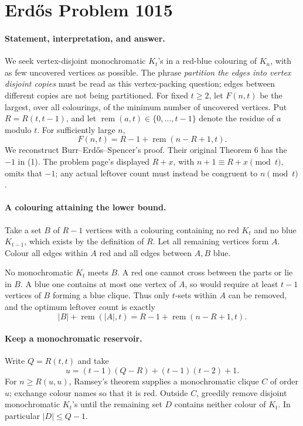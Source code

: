 \section*{Erd\H{o}s Problem 1015}

\paragraph{Statement, interpretation, and answer.}
We seek vertex-disjoint monochromatic \(K_t\)'s in a red-blue colouring of \(K_n\), with as few uncovered vertices as possible. The phrase \emph{partition the edges into vertex disjoint copies} must be read as this vertex-packing question; edges between different copies are not being partitioned. For fixed \(t\geq2\), let \(F(n,t)\) be the largest, over all colourings, of the minimum number of uncovered vertices. Put \(R=R(t,t-1)\), and let \(\operatorname{rem}(a,t)\in\{0,\ldots,t-1\}\) denote the residue of \(a\) modulo \(t\). For sufficiently large \(n\),
\[
 \boxed{F(n,t)=R-1+\operatorname{rem}(n-R+1,t).}
\tag{1}
\]
We reconstruct Burr--Erd\H{o}s--Spencer's proof. Their original Theorem 6 has the \(-1\) in (1). The problem page's displayed \(R+x\), with \(n+1\equiv R+x\pmod t\), omits that \(-1\); any actual leftover count must instead be congruent to \(n\pmod t\).

\paragraph{A colouring attaining the lower bound.}
Take a set \(B\) of \(R-1\) vertices with a colouring containing no red \(K_t\) and no blue \(K_{t-1}\), which exists by the definition of \(R\). Let all remaining vertices form \(A\). Colour all edges within \(A\) red and all edges between \(A,B\) blue.

No monochromatic \(K_t\) meets \(B\). A red one cannot cross between the parts or lie in \(B\). A blue one contains at most one vertex of \(A\), so would require at least \(t-1\) vertices of \(B\) forming a blue clique. Thus only \(t\)-sets within \(A\) can be removed, and the optimum leftover count is exactly
\[
 |B|+\operatorname{rem}(|A|,t)=R-1+\operatorname{rem}(n-R+1,t).
\]

\paragraph{Keep a monochromatic reservoir.}
Write \(Q=R(t,t)\) and take
\[
 u=(t-1)(Q-R)+(t-1)(t-2)+1.
\]
For \(n\geq R(u,u)\), Ramsey's theorem supplies a monochromatic clique \(C\) of order \(u\); exchange colour names so that it is red. Outside \(C\), greedily remove disjoint monochromatic \(K_t\)'s until the remaining set \(D\) contains neither colour of \(K_t\). In particular \(|D|\leq Q-1\).

